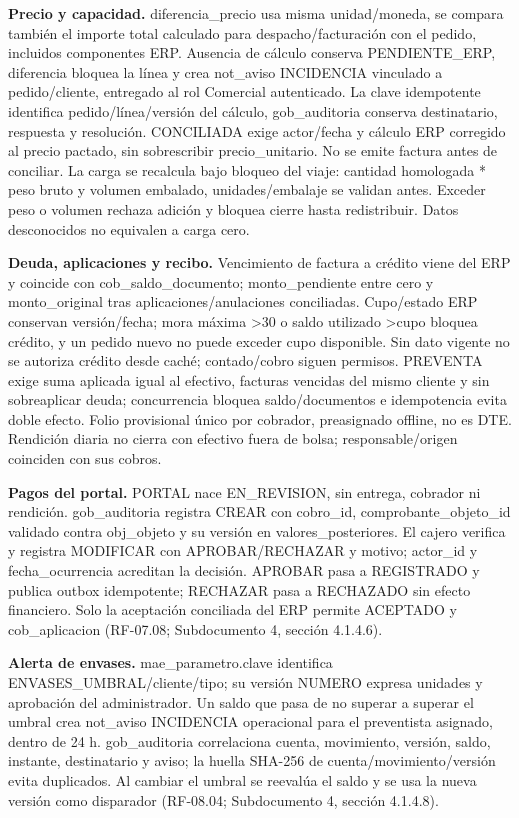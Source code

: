 \textbf{Precio y capacidad.} diferencia\_precio usa misma unidad/moneda, se compara también el importe total calculado para despacho/facturación con el pedido, incluidos componentes ERP. Ausencia de cálculo conserva PENDIENTE\_ERP, diferencia bloquea la línea y crea not\_aviso INCIDENCIA vinculado a pedido/cliente, entregado al rol Comercial autenticado. La clave idempotente identifica pedido/línea/versión del cálculo, gob\_auditoria conserva destinatario, respuesta y resolución. CONCILIADA exige actor/fecha y cálculo ERP corregido al precio pactado, sin sobrescribir precio\_unitario. No se emite factura antes de conciliar. La carga se recalcula bajo bloqueo del viaje: cantidad homologada * peso bruto y volumen embalado, unidades/embalaje se validan antes. Exceder peso o volumen rechaza adición y bloquea cierre hasta redistribuir. Datos desconocidos no equivalen a carga cero.

\textbf{Deuda, aplicaciones y recibo.} Vencimiento de factura a crédito viene del ERP y coincide con cob\_saldo\_documento; monto\_pendiente entre cero y monto\_original tras aplicaciones/anulaciones conciliadas. Cupo/estado ERP conservan versión/fecha; mora máxima >30 o saldo utilizado >cupo bloquea crédito, y un pedido nuevo no puede exceder cupo disponible. Sin dato vigente no se autoriza crédito desde caché; contado/cobro siguen permisos. PREVENTA exige suma aplicada igual al efectivo, facturas vencidas del mismo cliente y sin sobreaplicar deuda; concurrencia bloquea saldo/documentos e idempotencia evita doble efecto. Folio provisional único por cobrador, preasignado offline, no es DTE. Rendición diaria no cierra con efectivo fuera de bolsa; responsable/origen coinciden con sus cobros.

\textbf{Pagos del portal.} PORTAL nace EN\_REVISION, sin entrega, cobrador ni rendición. gob\_auditoria registra CREAR con cobro\_id, comprobante\_objeto\_id validado contra obj\_objeto y su versión en valores\_posteriores. El cajero verifica y registra MODIFICAR con APROBAR/RECHAZAR y motivo; actor\_id y fecha\_ocurrencia acreditan la decisión. APROBAR pasa a REGISTRADO y publica outbox idempotente; RECHAZAR pasa a RECHAZADO sin efecto financiero. Solo la aceptación conciliada del ERP permite ACEPTADO y cob\_aplicacion (RF-07.08; Subdocumento 4, sección 4.1.4.6).

\textbf{Alerta de envases.} mae\_parametro.clave identifica ENVASES\_UMBRAL/cliente/tipo; su versión NUMERO expresa unidades y aprobación del administrador. Un saldo que pasa de no superar a superar el umbral crea not\_aviso INCIDENCIA operacional para el preventista asignado, dentro de 24 h. gob\_auditoria correlaciona cuenta, movimiento, versión, saldo, instante, destinatario y aviso; la huella SHA-256 de cuenta/movimiento/versión evita duplicados. Al cambiar el umbral se reevalúa el saldo y se usa la nueva versión como disparador (RF-08.04; Subdocumento 4, sección 4.1.4.8).

